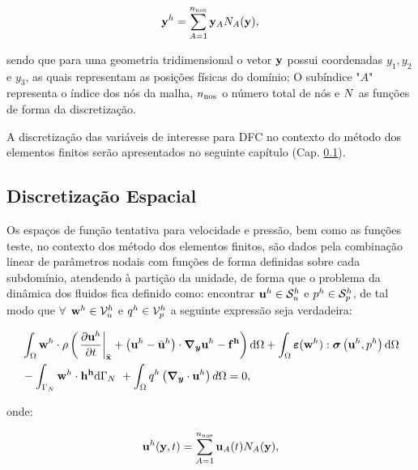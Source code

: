 \documentclass[tese_patricia]{subfiles}%
\begin{document}
\begin{align}
	\mathbf{y}^{h} = \sum_{A = 1}^{n_{\mathrm{nos}}} \mathbf{y}_{A}N_{A}(\mathbf{y}),  \label{eq:interp_geo}
\end{align}

\noindent sendo que para uma geometria tridimensional o vetor $\mathbf{y}$ possui coordenadas $y_1,y_2$ e $y_3$, as quais representam as posições físicas do domínio; O subíndice "$A$" $ \ $ representa o índice dos nós da malha, $n_{\mathrm{nos}}$ o número total de nós e $N$ as funções de forma da discretização.

A discretização das variáveis de interesse para DFC no contexto do método dos elementos finitos serão apresentados no seguinte capítulo (Cap. \ref{capitulo:Cap2:DiscEspacial}).


\subsection{Discretização Espacial} \label{capitulo:Cap2:DiscEspacial}

Os espaços de função tentativa para velocidade e pressão, bem como as funções teste, no contexto dos método dos elementos finitos, são dados pela combinação linear de parâmetros nodais com funções de forma definidas sobre cada subdomínio, atendendo à partição da unidade, de forma que o problema da dinâmica dos fluidos fica definido como: encontrar $\mathbf{u}^h \in \mathcal{S}_u^h$ e $p^h \in \mathcal{S}_p^h$, de tal modo que $\forall$ $\mathbf{w}^h \in \mathcal{V}_u^h$ e $q^h \in \mathcal{V}_p^h$ a seguinte expressão seja verdadeira:

\begin{align}
	\begin{split}
		&\int_{\Omega} \mathbf{w}^h \cdot \rho \left(\left. \frac{\partial\mathbf{u}^h}{\partial t} \right|_{\bar{\mathbf{x}}} + \left(\mathbf{u}^h - \bar{\mathbf{u}}^h \right)\cdot\boldsymbol{\nabla_y} \mathbf{u}^h - \mathbf{f^h} \right) \mathrm{d} \Omega + \int_{\Omega} \bm{\varepsilon}(\mathbf{w}^h) : \boldsymbol{\sigma}\left(\mathbf{u}^h,p^h \right)  \mathrm{d} \Omega\\ & - \int_{\Gamma_{N}} \mathbf{w}^h \cdot \mathbf{h^h} \mathrm{d} \Gamma_{N} \ + \int_{\Omega} q^h \left(\boldsymbol{\nabla_y} \cdot \mathbf{u}^h\right) d \Omega = 0,  \label{eq:QM_C_forma_fraca_1} 
	\end{split}
\end{align}

\noindent onde:

\begin{align}
\mathbf{u}^h(\mathbf{y},t) = \sum_{A = 1}^{n_{\mathrm{nos}}} \mathbf{u}_{A}(t)N_{A}(\mathbf{y}), \label{eq:interp_vel}
\end{align}
\end{document}
